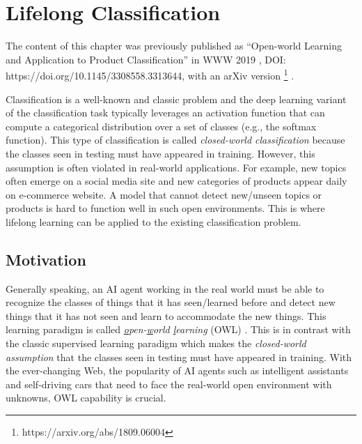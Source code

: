 \chapter{Lifelong Classification}
\label{chap2:open}

The content of this chapter was previously published as ``Open-world Learning and Application to Product Classification'' in WWW 2019 \cite{xu2019open}, DOI: https://doi.org/10.1145/3308558.3313644, with an arXiv version \footnote{https://arxiv.org/abs/1809.06004} \cite{xu2018open}.

Classification is a well-known and classic problem and the deep learning variant of the classification task typically leverages an activation function that can compute a categorical distribution over a set of classes (e.g., the softmax function).
This type of classification is called \textit{closed-world classification} because the classes seen in testing must have appeared in training. However, this assumption is often violated in real-world applications. For example, new topics often emerge on a social media site and new categories of products appear daily on e-commerce website. 
A model that cannot detect new/unseen topics or products is hard to function well in such open environments.  
This is where lifelong learning can be applied to the existing classification problem.

\section{Motivation}
Generally speaking, an AI agent working in the real world must be able to recognize the classes of things that it has seen/learned before and detect new things that it has not seen and learn to accommodate the new things. This learning paradigm is called \textit{\underline{o}pen-\underline{w}orld \underline{l}earning} (OWL)
\cite{chen2018lifelong,bendale2015towards,fei2016learning}. 
This is in contrast with the classic supervised learning paradigm which makes the \textit{closed-world assumption} that the classes seen in testing must have appeared in training. With the ever-changing Web, the popularity of AI agents such as intelligent assistants and self-driving cars that need to face the real-world open environment with unknowns, OWL capability is crucial.

